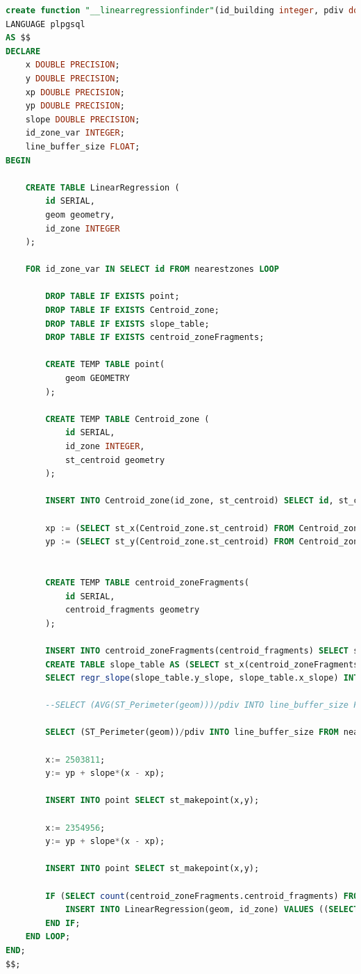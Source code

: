 \begin{lstlisting}[language=SQL]
create function "__linearregressionfinder"(id_building integer, pdiv double precision) returns void
LANGUAGE plpgsql
AS $$
DECLARE
	x DOUBLE PRECISION;
	y DOUBLE PRECISION;
	xp DOUBLE PRECISION;
	yp DOUBLE PRECISION;
	slope DOUBLE PRECISION;
	id_zone_var INTEGER;
	line_buffer_size FLOAT;
BEGIN

	CREATE TABLE LinearRegression (
		id SERIAL,
		geom geometry,
		id_zone INTEGER
	);

	FOR id_zone_var IN SELECT id FROM nearestzones LOOP

		DROP TABLE IF EXISTS point;
		DROP TABLE IF EXISTS Centroid_zone;
		DROP TABLE IF EXISTS slope_table;
		DROP TABLE IF EXISTS centroid_zoneFragments;

		CREATE TEMP TABLE point(
			geom GEOMETRY
		);
		
		CREATE TEMP TABLE Centroid_zone (
			id SERIAL,
			id_zone INTEGER,
			st_centroid geometry
		);

		INSERT INTO Centroid_zone(id_zone, st_centroid) SELECT id, st_centroid(nearestzones.geom) FROM nearestzones;

		xp := (SELECT st_x(Centroid_zone.st_centroid) FROM Centroid_zone WHERE Centroid_zone.id_zone = id_zone_var);
		yp := (SELECT st_y(Centroid_zone.st_centroid) FROM Centroid_zone WHERE Centroid_zone.id_zone = id_zone_var);


		CREATE TEMP TABLE centroid_zoneFragments(
			id SERIAL,
			centroid_fragments geometry
		);

		INSERT INTO centroid_zoneFragments(centroid_fragments) SELECT st_centroid(geom) FROM zonefragments WHERE id_zone = id_zone_var;
		CREATE TABLE slope_table AS (SELECT st_x(centroid_zoneFragments.centroid_fragments) as x_slope , st_y(centroid_zoneFragments.centroid_fragments) AS y_slope FROM centroid_zoneFragments);
		SELECT regr_slope(slope_table.y_slope, slope_table.x_slope) INTO slope FROM slope_table;

		--SELECT (AVG(ST_Perimeter(geom)))/pdiv INTO line_buffer_size FROM zonefragments WHERE id_zone = id_zone_var;

		SELECT (ST_Perimeter(geom))/pdiv INTO line_buffer_size FROM nearestzones WHERE id = id_zone_var;

		x:= 2503811;
		y:= yp + slope*(x - xp);

		INSERT INTO point SELECT st_makepoint(x,y);
		
		x:= 2354956;
		y:= yp + slope*(x - xp);
		
		INSERT INTO point SELECT st_makepoint(x,y);

		IF (SELECT count(centroid_zoneFragments.centroid_fragments) FROM centroid_zoneFragments) > 3 THEN
			INSERT INTO LinearRegression(geom, id_zone) VALUES ((SELECT st_buffer(st_makeline(st_setsrid(point.geom,3004)), line_buffer_size) FROM point), id_zone_var);
		END IF;
	END LOOP;
END;
$$;
\end{lstlisting}

